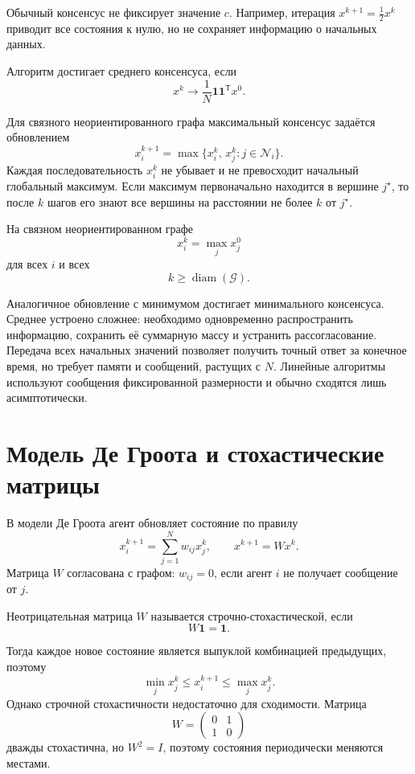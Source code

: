 Обычный консенсус не фиксирует значение \(c\). Например, итерация
\(x^{k+1}=\tfrac12x^k\) приводит все состояния к нулю, но не сохраняет
информацию о начальных данных.

\begin{definition}
Алгоритм достигает среднего консенсуса, если
\[
    x^k
    \longrightarrow
    \frac1N\mathbf1\mathbf1^{\mathsf T}x^0.
\]
\end{definition}

Для связного неориентированного графа максимальный консенсус задаётся
обновлением
\[
    x_i^{k+1}
    =
    \max\bigl\{x_i^k,\,x_j^k:j\in\mathcal N_i\bigr\}.
\]
Каждая последовательность \(x_i^k\) не убывает и не превосходит
начальный глобальный максимум. Если максимум первоначально находится
в вершине \(j^\star\), то после \(k\) шагов его знают все вершины на
расстоянии не более \(k\) от \(j^\star\).

\begin{theorem}
На связном неориентированном графе
\[
    x_i^k=\max_j x_j^0
\]
для всех \(i\) и всех
\[
    k\ge\operatorname{diam}(\mathcal G).
\]
\end{theorem}

Аналогичное обновление с минимумом достигает минимального консенсуса.
Среднее устроено сложнее: необходимо одновременно распространить
информацию, сохранить её суммарную массу и устранить рассогласование.
Передача всех начальных значений позволяет получить точный ответ за
конечное время, но требует памяти и сообщений, растущих с \(N\).
Линейные алгоритмы используют сообщения фиксированной размерности и
обычно сходятся лишь асимптотически.

\section{Модель Де Гроота и стохастические матрицы}

В модели Де Гроота агент обновляет состояние по правилу
\[
    x_i^{k+1}=\sum_{j=1}^{N}w_{ij}x_j^k,
    \qquad
    x^{k+1}=Wx^k.
\]
Матрица \(W\) согласована с графом: \(w_{ij}=0\), если агент \(i\) не
получает сообщение от \(j\).

\begin{definition}
Неотрицательная матрица \(W\) называется строчно-стохастической, если
\[
    W\mathbf1=\mathbf1.
\]
\end{definition}

Тогда каждое новое состояние является выпуклой комбинацией
предыдущих, поэтому
\[
    \min_jx_j^k
    \le x_i^{k+1}\le
    \max_jx_j^k.
\]
Однако строчной стохастичности недостаточно для сходимости. Матрица
\[
    W=
    \begin{pmatrix}
        0&1\\
        1&0
    \end{pmatrix}
\]
дважды стохастична, но \(W^2=I\), поэтому состояния периодически
меняются местами.

